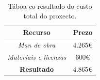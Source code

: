 \begin{table}[hp!]
    \centering
    \begin{tabular}{c|c}
    \rowcolor{udcpink!25}
    \textbf{Recurso} & \textbf{Prezo} 
    \\\hline
    \textit{Man de obra} & 4.265€\\
    \textit{Materiais e licenzas} & 600€\\
    \textbf{Resultado} & 4.865€ \\
    \end{tabular}
    \caption{Táboa co resultado do custo total do proxecto.}
    \label{tab:precio_final}
\end{table}